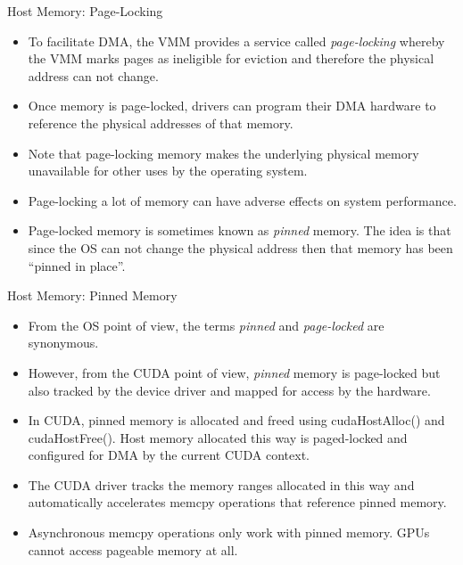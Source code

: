 \documentclass{beamer}
\begin{document}
\begin{frame}{Host Memory: Page-Locking}
\begin{itemize}
\itemsep1em
    \item<1->To facilitate DMA, the VMM provides a service called \emph{page-locking} whereby the VMM marks pages as ineligible for eviction and therefore the physical address can not change.
    \item<1->Once memory is page-locked, drivers can program their DMA hardware to reference the physical addresses of that memory.
    \item<1->Note that page-locking memory makes the underlying physical memory unavailable for other uses by the operating system.
    \item<1->Page-locking a lot of memory can have adverse effects on system performance.
    \item<1->Page-locked memory is sometimes known as \emph{pinned} memory.  The idea is that since the OS can not change the physical address then that memory has been ``pinned in place''.
\end{itemize}
\end{frame}

\begin{frame}{Host Memory: Pinned Memory}
\begin{itemize}
    \item<1->From the OS point of view, the terms \emph{pinned} and \emph{page-locked} are synonymous.
    \item<1->However, from the CUDA point of view, \emph{pinned} memory is page-locked but also tracked by the device driver and mapped for access by the hardware.
    \item<1->In CUDA, pinned memory is allocated and freed using {\selectfont cudaHostAlloc()} and {\selectfont cudaHostFree()}.  Host memory allocated this way is paged-locked and configured for DMA by the current CUDA context.
    \item<1->The CUDA driver tracks the memory ranges allocated in this way and automatically accelerates memcpy operations that reference pinned memory.
    \item<1->Asynchronous memcpy operations only work with pinned memory.  GPUs cannot access pageable memory at all.
\end{itemize}
\end{frame}
\end{document}
